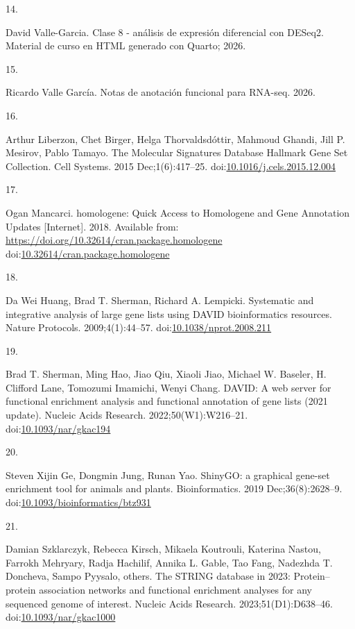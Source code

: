 \documentclass[
  12pt,
  letterpaper,
  DIV=11,
  numbers=noendperiod]{scrartcl}
\newlength{\cslhangindent}
\newlength{\csllabelwidth}
\newenvironment{CSLReferences}[2] %
 {\begin{list}{}{%
  \setlength{\itemindent}{0pt}
  \setlength{\leftmargin}{0pt}
  \setlength{\parsep}{0pt}
  \ifodd #1
   \setlength{\leftmargin}{\cslhangindent}
   \setlength{\itemindent}{-1\cslhangindent}
  \fi
  \setlength{\itemsep}{#2\baselineskip}}}
 {\end{list}}
\newcommand{\CSLLeftMargin}[1]{\parbox[t]{\csllabelwidth}{\strut#1\strut}}
\newcommand{\CSLRightInline}[1]{\parbox[t]{\linewidth - \csllabelwidth}{\strut#1\strut}}
\begin{document}
\begin{CSLReferences}{0}{1}
\CSLLeftMargin{14. }%
\CSLRightInline{David Valle-Garcia. Clase 8 - análisis de expresión
diferencial con DESeq2. Material de curso en HTML generado con Quarto;
2026.}

\CSLLeftMargin{15. }%
\CSLRightInline{Ricardo Valle García. Notas de anotaci{ó}n funcional
para RNA-seq. 2026.}

\CSLLeftMargin{16. }%
\CSLRightInline{Arthur Liberzon, Chet Birger, Helga Thorvaldsdóttir,
Mahmoud Ghandi, Jill P. Mesirov, Pablo Tamayo. {The Molecular Signatures
Database Hallmark Gene Set Collection}. Cell Systems. 2015
Dec;1(6):417--25.
doi:\href{https://doi.org/10.1016/j.cels.2015.12.004}{10.1016/j.cels.2015.12.004}}

\CSLLeftMargin{17. }%
\CSLRightInline{Ogan Mancarci. {homologene: Quick Access to Homologene
and Gene Annotation Updates} {[}Internet{]}. 2018. Available from:
\url{https://doi.org/10.32614/cran.package.homologene}
doi:\href{https://doi.org/10.32614/cran.package.homologene}{10.32614/cran.package.homologene}}

\CSLLeftMargin{18. }%
\CSLRightInline{Da Wei Huang, Brad T. Sherman, Richard A. Lempicki.
Systematic and integrative analysis of large gene lists using DAVID
bioinformatics resources. Nature Protocols. 2009;4(1):44--57.
doi:\href{https://doi.org/10.1038/nprot.2008.211}{10.1038/nprot.2008.211}}

\CSLLeftMargin{19. }%
\CSLRightInline{Brad T. Sherman, Ming Hao, Jiao Qiu, Xiaoli Jiao,
Michael W. Baseler, H. Clifford Lane, Tomozumi Imamichi, Wenyi Chang.
DAVID: A web server for functional enrichment analysis and functional
annotation of gene lists (2021 update). Nucleic Acids Research.
2022;50(W1):W216--21.
doi:\href{https://doi.org/10.1093/nar/gkac194}{10.1093/nar/gkac194}}

\CSLLeftMargin{20. }%
\CSLRightInline{Steven Xijin Ge, Dongmin Jung, Runan Yao. {ShinyGO: a
graphical gene-set enrichment tool for animals and plants}.
Bioinformatics. 2019 Dec;36(8):2628--9.
doi:\href{https://doi.org/10.1093/bioinformatics/btz931}{10.1093/bioinformatics/btz931}}

\CSLLeftMargin{21. }%
\CSLRightInline{Damian Szklarczyk, Rebecca Kirsch, Mikaela Koutrouli,
Katerina Nastou, Farrokh Mehryary, Radja Hachilif, Annika L. Gable, Tao
Fang, Nadezhda T. Doncheva, Sampo Pyysalo, others. The STRING database
in 2023: Protein--protein association networks and functional enrichment
analyses for any sequenced genome of interest. Nucleic Acids Research.
2023;51(D1):D638--46.
doi:\href{https://doi.org/10.1093/nar/gkac1000}{10.1093/nar/gkac1000}}


\end{CSLReferences}
\end{document}
